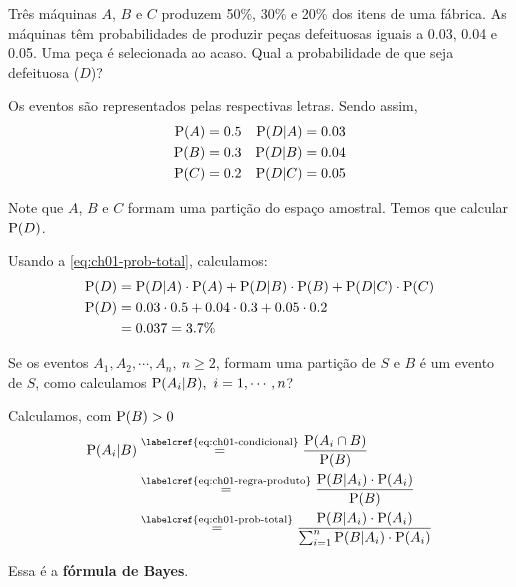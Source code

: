 \begin{example}\label{exp:ch01-prob-total-fabica}
    Três máquinas $A$, $B$ e $C$ produzem 50\%, 30\% e 20\%
    dos itens de uma fábrica. As máquinas têm probabilidades de produzir
    peças defeituosas iguais a 0.03, 0.04 e 0.05.
    Uma  peça é selecionada ao acaso. Qual a probabilidade de que seja defeituosa ($D$)?

    \bigskip
    Os eventos são representados pelas respectivas letras.
    Sendo assim,
    \begin{align*}
        \operatorname{P}(A) &= 0.5 & \operatorname{P}(D|A) &= 0.03 \\
        \operatorname{P}(B) &= 0.3 & \operatorname{P}(D|B) &= 0.04 \\
        \operatorname{P}(C) &= 0.2 & \operatorname{P}(D|C) &= 0.05
    \end{align*}

    Note que $A$, $B$ e $C$ formam uma partição do espaço amostral.
    Temos que calcular $\operatorname{P}(D)$.
    
    Usando a \cref{eq:ch01-prob-total}, calculamos:
    \begin{align*}
        \operatorname{P}(D) &=
            \operatorname{P}(D|A) \cdot \operatorname{P}(A) 
            + \operatorname{P}(D|B) \cdot \operatorname{P}(B) 
            + \operatorname{P}(D|C) \cdot \operatorname{P}(C) \\
        \operatorname{P}(D) &=
            0.03 \cdot 0.5 + 0.04 \cdot 0.3  + 0.05 \cdot 0.2 \\
        &= 0.037 = 3.7\%
    \end{align*}
\end{example}

Se os eventos $A_1, A_2, \cdots, A_n,\ n \geq 2$, formam uma
partição de $S$ e $B$ é um evento de $S$, como calculamos
$\operatorname{P}(A_i | B),\ i=1,\cdots,n$?

Calculamos, com $\operatorname{P}(B) > 0$
\begin{align}
    \Prob(A_i | B) &\overset{\text{\labelcref{eq:ch01-condicional}}}{=}
        \frac{\Prob(A_i \cap B)}{\Prob(B)} \notag \\
    &\overset{\text{\labelcref{eq:ch01-regra-produto}}}{=}
        \frac{\Prob(B | A_i) \cdot \Prob(A_i)}{\Prob(B)} \notag \\
    &\overset{\text{\labelcref{eq:ch01-prob-total}}}{=}
        \frac{\Prob(B | A_i) \cdot \Prob(A_i)}
        {\sum_{i=1}^n \Prob(B | A_i) \cdot \Prob(A_i)} \label{eq:ch01-bayes}
\end{align}

Essa é a \textbf{fórmula de Bayes}.

